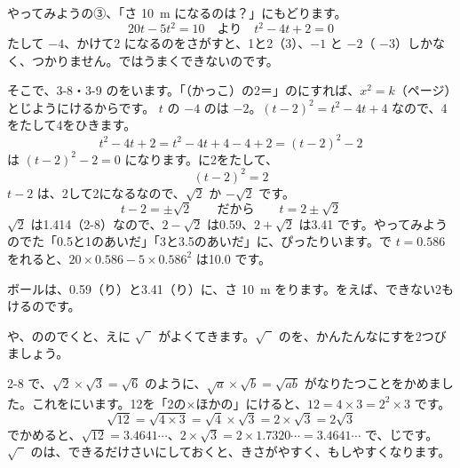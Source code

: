 \leavevmode\label{bk:3-10:heihou}やってみようの③、「さ \qty{10}{m} になるのは？」にもどります。
\[ 20t-5t^2=10\quad\text{より}\quad t^2-4t+2=0 \]
たして $-4$、かけて2 になるのをさがすと、1と2（3）、$-1$ と $-2$（ $-3$）しかなく、つかりません。ではうまくできないのです。

そこで、3-8・3-9 のをいます。「（かっこ）の2＝」のにすれば、$x^2=k$（\pageref{bk:3-10:root}ページ）とじようにけるからです。
$t$ の $-4$ のは $-2$。$(t-2)^2=t^2-4t+4$ なので、4をたして4をひきます。
\[ t^2-4t+2=t^2-4t+4-4+2=(t-2)^2-2 \]
は $(t-2)^2-2=0$ になります。に2をたして、
\[ (t-2)^2=2 \]
$t-2$ は、2して2になるなので、$\sqrt{2}$ か $-\sqrt{2}$ です。
\[ t-2=\pm\sqrt{2}\qquad\text{だから}\qquad t=2\pm\sqrt{2} \]
$\sqrt{2}$ は1.414（2-8）なので、$2-\sqrt{2}$ は0.59、$2+\sqrt{2}$ は3.41 です。やってみようのでた「0.5と1のあいだ」「3と3.5のあいだ」に、ぴったりいます。で $t=0.586$ をれると、$20\times0.586-5\times0.586^2$ は10.0 です。

ボールは、0.59（り）と3.41（り）に、さ \qty{10}{m} をります。をえば、できない2もけるのです。


\leavevmode\label{bk:3-10:sqrt}や、ののでくと、えに $\sqrt{\phantom{2}}$ がよくてきます。$\sqrt{\phantom{2}}$ のを、かんたんなにすを2つびましょう。

2-8 で、$\sqrt{2}\times\sqrt{3}=\sqrt{6}$ のように、$\sqrt{a}\times\sqrt{b}=\sqrt{ab}$ がなりたつことをかめました。これをにいます。12を「2の×ほかの」にけると、$12=4\times3=2^2\times3$ です。
\[ \sqrt{12}=\sqrt{4\times3}=\sqrt{4}\times\sqrt{3}=2\times\sqrt{3}=2\sqrt{3} \]
でかめると、$\sqrt{12}=3.4641\cdots$、$2\times\sqrt{3}=2\times1.7320\cdots=3.4641\cdots$ で、じです。$\sqrt{\phantom{2}}$ のは、できるだけさいにしておくと、きさがやすく、もしやすくなります。

